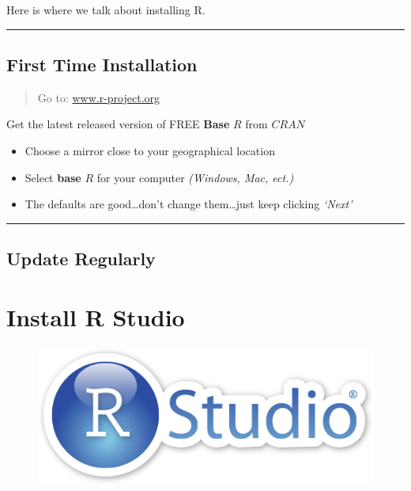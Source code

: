 \documentclass[]{book}
\providecommand{\tightlist}{%
  \setlength{\itemsep}{0pt}\setlength{\parskip}{0pt}}
\begin{document}
Here is where we talk about installing R.

\begin{center}\rule{0.5\linewidth}{\linethickness}\end{center}

\section{First Time Installation}\label{first-time-installation}

\begin{quote}
Go to: \href{http://www.r-project.org}{www.r-project.org}
\end{quote}

Get the latest released version of FREE \textbf{Base} \(R\) from
\(CRAN\)

\begin{itemize}
\tightlist
\item
  Choose a mirror close to your geographical location
\item
  Select \textbf{base} \(R\) for your computer \emph{(Windows, Mac,
  ect.)}
\item
  The defaults are good\ldots{}don't change them\ldots{}just keep
  clicking \emph{`Next'}
\end{itemize}

\begin{center}\rule{0.5\linewidth}{\linethickness}\end{center}

\section{Update Regularly}\label{update-regularly}

\chapter{Install R Studio}\label{install-r-studio}

\begin{figure}
\centering
\includegraphics{images/rstudiosticker.png}
\caption{}
\end{figure}
\end{document}
